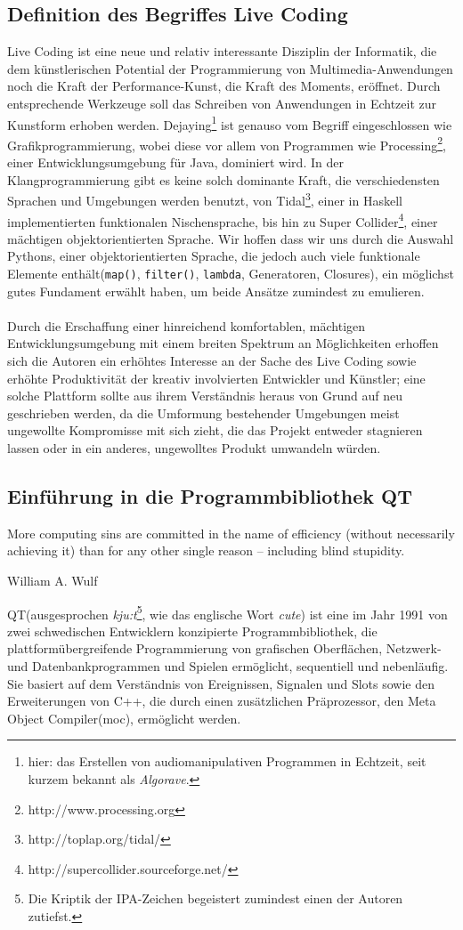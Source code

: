 \subsection{Definition des Begriffes Live Coding} \label{sec:LiveCoding}
	Live Coding ist eine neue und relativ interessante Disziplin der Informatik, die dem künstlerischen Potential der Programmierung von
	Multimedia-Anwendungen noch die Kraft der Performance-Kunst, die Kraft des Moments, eröffnet. Durch entsprechende Werkzeuge soll das 
	Schreiben von Anwendungen in Echtzeit zur Kunstform erhoben werden. Dejaying\footnote{hier: das Erstellen von audiomanipulativen Programmen 
	in Echtzeit, seit kurzem bekannt als \textit{Algorave}.} ist genauso vom Begriff eingeschlossen wie Grafikprogrammierung, wobei diese vor allem von 
	Programmen wie Processing\footnote{http://www.processing.org}, einer Entwicklungsumgebung für Java, dominiert wird. In der Klangprogrammierung
	gibt es keine solch dominante Kraft, die verschiedensten Sprachen und Umgebungen werden benutzt, von Tidal\footnote{http://toplap.org/tidal/}, einer
	in Haskell implementierten funktionalen Nischensprache, bis hin zu Super Collider\footnote{http://supercollider.sourceforge.net/}, einer mächtigen 
    objektorientierten Sprache. Wir hoffen dass wir uns durch die Auswahl Pythons, einer objektorientierten Sprache, die jedoch auch viele funktionale
    Elemente enthält(\texttt{map()}, \texttt{filter()}, \texttt{lambda}, Generatoren, Closures), ein möglichst gutes Fundament erwählt haben, um beide Ansätze 
    zumindest zu emulieren.
\paragraph{}
	Durch die Erschaffung einer hinreichend komfortablen, mächtigen Entwicklungsumgebung mit einem breiten Spektrum an Möglichkeiten erhoffen sich 
	die Autoren ein erhöhtes Interesse an der Sache des Live Coding sowie erhöhte Produktivität der kreativ involvierten Entwickler und Künstler; eine
	solche Plattform sollte aus ihrem Verständnis heraus von Grund auf neu geschrieben werden, da die Umformung bestehender Umgebungen meist
	ungewollte Kompromisse mit sich zieht, die das Projekt entweder stagnieren lassen oder in ein anderes, ungewolltes Produkt umwandeln würden.
\newpage
\subsection{Einführung in die Programmbibliothek QT} \label{sec:QT}
\epigraph{More computing sins are committed in the name of efficiency (without necessarily achieving it) than for any other single reason – including blind stupidity.}
{William A. Wulf}
	QT(ausgesprochen \textit{kju:t}\footnote{Die Kriptik der IPA-Zeichen begeistert zumindest einen der Autoren zutiefst.}, wie das englische Wort 
	\textit{cute}) ist eine im Jahr 1991 von zwei schwedischen Entwicklern konzipierte Programmbibliothek, die plattformübergreifende Programmierung 
	von grafischen Oberflächen, Netzwerk- und Datenbankprogrammen und Spielen ermöglicht, sequentiell und nebenläufig. Sie basiert auf dem Verständnis 
    von Ereignissen, Signalen und Slots sowie den Erweiterungen von C++, die durch einen zusätzlichen Präprozessor, den Meta Object Compiler(moc),
	ermöglicht werden. 
